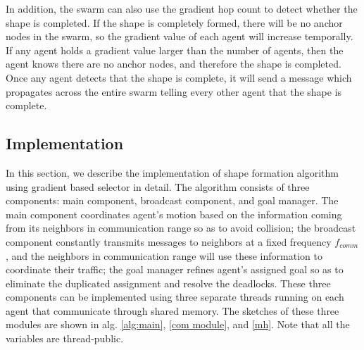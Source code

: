 \documentclass[journal]{IEEEtran}
\begin{document}
In addition, the swarm can also use the gradient hop count to detect whether the shape is completed. If the shape is completely formed, there will be no anchor nodes in the swarm, so the gradient value of each agent will increase temporally.  If any agent holds a gradient value larger than the number of agents, then the agent knows there are no anchor nodes, and therefore the shape is completed. Once any agent detects that the shape is complete, it will send a message which propagates across the entire swarm telling every other agent that the shape is complete. 


\subsection{Implementation}
\label{implementaion}
In this section, we describe the implementation of shape formation algorithm using gradient based selector in detail. The algorithm consists of three components: main
component, broadcast component, and goal manager. The main component coordinates agent's motion based on the information coming from its neighbors in communication range so as to avoid collision; the broadcast
component constantly transmits messages to neighbors at a fixed frequency $f_{comm}$, and the neighbors in communication range will use these information to coordinate their traffic; the goal manager refines agent's assigned goal so as to eliminate the duplicated assignment and resolve the deadlocks. These three components can be implemented using three separate threads running on each agent that communicate through shared memory. The sketches of these three modules are shown in alg. \ref{alg:main}, \ref{com module}, and \ref{mh}. Note that all the variables are thread-public.
\end{document}
